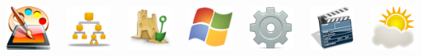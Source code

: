\documentclass[green]{beamer}
\begin{document}
\begin{frame}
\begin{columns}[c]
	\begin{center}
	    \includegraphics[scale=0.3]{img/pintura.png}
	\end{center}
	
	\begin{center}
	    \includegraphics[scale=0.3]{img/arbol.png}
	\end{center}
	
	\column{40pt}
	
	\begin{center}
	    \includegraphics[scale=0.3]{img/castillo.png}
	\end{center}
	
	\begin{center}
	    \includegraphics[scale=0.3]{img/windows.png}
	\end{center}
	
	\begin{center}
	    \includegraphics[scale=0.3]{img/engranaje.png}
	\end{center}
	
	\begin{center}
	    \includegraphics[scale=0.3]{img/claqueta.png}
	\end{center}
	
	\begin{center}
	    \includegraphics[scale=0.3]{img/entorno.png}
	\end{center}
	
    \end{columns} 
\end{frame}
\end{document}
